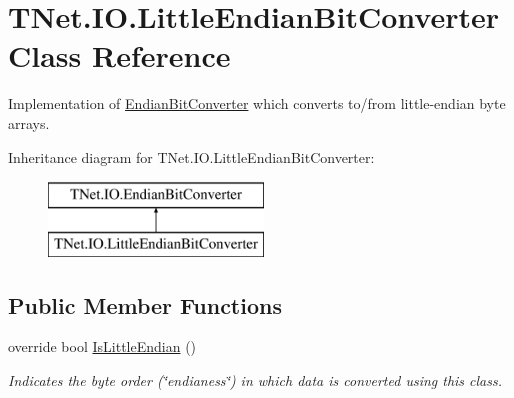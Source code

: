 \hypertarget{class_t_net_1_1_i_o_1_1_little_endian_bit_converter}{}\section{T\+Net.\+I\+O.\+Little\+Endian\+Bit\+Converter Class Reference}
\label{class_t_net_1_1_i_o_1_1_little_endian_bit_converter}


Implementation of \mbox{\hyperlink{class_t_net_1_1_i_o_1_1_endian_bit_converter}{Endian\+Bit\+Converter}} which converts to/from little-\/endian byte arrays.  


Inheritance diagram for T\+Net.\+I\+O.\+Little\+Endian\+Bit\+Converter\+:\begin{figure}[H]
\begin{center}
\leavevmode
\includegraphics[height=2.000000cm]{class_t_net_1_1_i_o_1_1_little_endian_bit_converter}
\end{center}
\end{figure}
\subsection*{Public Member Functions}
\begin{DoxyCompactItemize}
\item 
override bool \mbox{\hyperlink{class_t_net_1_1_i_o_1_1_little_endian_bit_converter_a72c11f0120a83ac3a81574f98beb7278}{Is\+Little\+Endian}} ()
\begin{DoxyCompactList}\small\item\em Indicates the byte order (\char`\"{}endianess\char`\"{}) in which data is converted using this class. \end{DoxyCompactList}\end{DoxyCompactItemize}
